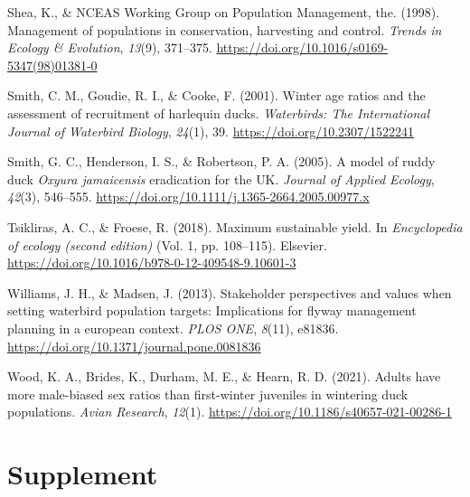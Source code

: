 \documentclass[
  english,
]{article}
\newlength{\cslhangindent}
\newlength{\cslentryspacingunit} %
\newenvironment{CSLReferences}[2] %
 {%
  \setlength{\parindent}{0pt}
  \ifodd #1
  \let\oldpar\par
  \def\par{\hangindent=\cslhangindent\oldpar}
  \fi
  \setlength{\parskip}{#2\cslentryspacingunit}
 }%
 {}
\begin{document}
\begin{CSLReferences}{1}{0}
\leavevmode{}%
Shea, K., \& NCEAS Working Group on Population Management, the. (1998). Management of populations in conservation, harvesting and control. \emph{Trends in Ecology \& Evolution}, \emph{13}(9), 371--375. \url{https://doi.org/10.1016/s0169-5347(98)01381-0}

\leavevmode{}%
Smith, C. M., Goudie, R. I., \& Cooke, F. (2001). Winter age ratios and the assessment of recruitment of harlequin ducks. \emph{Waterbirds: The International Journal of Waterbird Biology}, \emph{24}(1), 39. \url{https://doi.org/10.2307/1522241}

\leavevmode{}%
Smith, G. C., Henderson, I. S., \& Robertson, P. A. (2005). A model of ruddy duck \emph{{O}xyura jamaicensis} eradication for the {UK}. \emph{Journal of Applied Ecology}, \emph{42}(3), 546--555. \url{https://doi.org/10.1111/j.1365-2664.2005.00977.x}

\leavevmode{}%
Tsikliras, A. C., \& Froese, R. (2018). Maximum sustainable yield. In \emph{Encyclopedia of ecology (second edition)} (Vol. 1, pp. 108--115). Elsevier. \url{https://doi.org/10.1016/b978-0-12-409548-9.10601-3}

\leavevmode{}%
Williams, J. H., \& Madsen, J. (2013). Stakeholder perspectives and values when setting waterbird population targets: Implications for flyway management planning in a european context. \emph{{PLOS} {ONE}}, \emph{8}(11), e81836. \url{https://doi.org/10.1371/journal.pone.0081836}

\leavevmode{}%
Wood, K. A., Brides, K., Durham, M. E., \& Hearn, R. D. (2021). Adults have more male-biased sex ratios than first-winter juveniles in wintering duck populations. \emph{Avian Research}, \emph{12}(1). \url{https://doi.org/10.1186/s40657-021-00286-1}

\end{CSLReferences}

\newpage

\hypertarget{appendix-supplement}{%
\appendix}


\hypertarget{supplement}{%
\section{Supplement}\label{supplement}}
\end{document}
